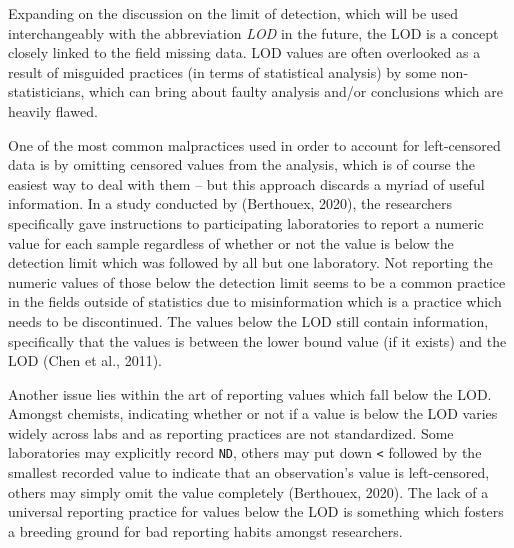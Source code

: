 \documentclass[12pt, twoside]{amherstthesis}
\begin{document}
Expanding on the discussion on the limit of detection, which will be used interchangeably with the abbreviation \emph{LOD} in the future, the LOD is a concept closely linked to the field missing data. LOD values are often overlooked as a result of misguided practices (in terms of statistical analysis) by some non-statisticians, which can bring about faulty analysis and/or conclusions which are heavily flawed.

One of the most common malpractices used in order to account for left-censored data is by omitting censored values from the analysis, which is of course the easiest way to deal with them -- but this approach discards a myriad of useful information. In a study conducted by (Berthouex, 2020), the researchers specifically gave instructions to participating laboratories to report a numeric value for each sample regardless of whether or not the value is below the detection limit which was followed by all but one laboratory. Not reporting the numeric values of those below the detection limit seems to be a common practice in the fields outside of statistics due to misinformation which is a practice which needs to be discontinued. The values below the LOD still contain information, specifically that the values is between the lower bound value (if it exists) and the LOD (Chen et al., 2011).

Another issue lies within the art of reporting values which fall below the LOD. Amongst chemists, indicating whether or not if a value is below the LOD varies widely across labs and as reporting practices are not standardized. Some laboratories may explicitly record \texttt{ND}, others may put down \texttt{\textless{}} followed by the smallest recorded value to indicate that an observation's value is left-censored, others may simply omit the value completely (Berthouex, 2020). The lack of a universal reporting practice for values below the LOD is something which fosters a breeding ground for bad reporting habits amongst researchers.
\end{document}
